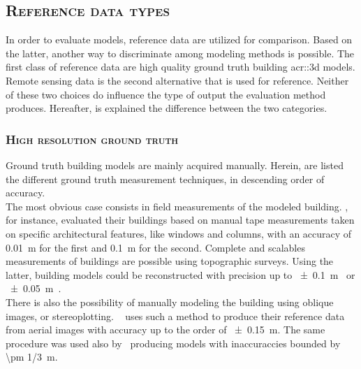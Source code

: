     \subsection{\textsc{Reference data types}}
        \label{subsec::state_of_the_art::quality::reference}
        In order to evaluate models, reference data are utilized for comparison.
        Based on the latter, another way to discriminate among modeling methods is possible.
        The first class of reference data are high quality ground truth building \gls{acr::3d} models.
        Remote sensing data is the second alternative that is used for reference.
        Neither of these two choices do influence the type of output the evaluation method produces.
        Hereafter, is explained the difference between the two categories.

        \subsubsection{\textsc{High resolution ground truth}}
            Ground truth building models are mainly acquired manually.
            Herein, are listed the different ground truth measurement techniques, in descending order of accuracy.\\

            The most obvious case consists in field measurements of the modeled building.
            \textcite{dick2004modelling}, for instance, evaluated their buildings based on manual tape measurements taken on specific architectural features, like windows and columns, with an accuracy of \SI{0.01}{\m} for the first and \SI{0.1}{\m} for the second.
            Complete and scalables measurements of buildings are possible using topographic surveys.
            Using the latter, building models could be reconstructed with precision up to \SI{\pm 0.1}{\m}~\parencite{henricsson19973} or \SI{\pm 0.05}{\m}~\parencite{vogtle2003quality}.\\
            There is also the possibility of manually modeling the building using oblique images, or stereoplotting.
            ~\textcite{zebedin2008fusion} uses such a method to produce their reference data from aerial images with accuracy up to the order of \SI{\pm 0.15}{\m}.
            The same procedure was used also by~\textcite{jaynes2003recognition} producing models with inaccuraccies bounded by \SI[fraction-function = \sfrac]{\pm 1/3}{\m}.

